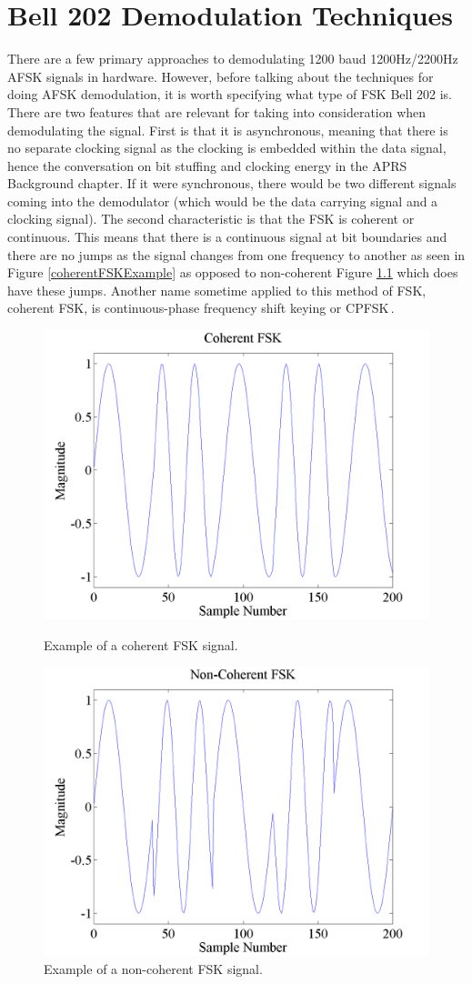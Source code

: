 \chapter{Bell 202 Demodulation Techniques}
There are a few primary approaches to demodulating 1200 baud 1200Hz/2200Hz AFSK signals in hardware.  However, before talking about the techniques for doing AFSK demodulation, it is worth specifying what type of FSK Bell 202 is. There are two features that are relevant for taking into consideration when demodulating the signal. First is that it is asynchronous, meaning that there is no separate clocking signal as the clocking is embedded within the data signal, hence the conversation on bit stuffing and clocking energy in the APRS Background chapter. If it were synchronous, there would be two different signals coming into the demodulator (which would be the data carrying signal and a clocking signal). The second characteristic is that the FSK is coherent or continuous. This means that there is a continuous signal at bit boundaries and there are no jumps as the signal changes from one frequency to another as seen in Figure \ref{coherentFSKExample} as opposed to non-coherent Figure \ref{noncoherentFSKExample} which does have these jumps. Another name sometime applied to this method of FSK, coherent FSK, is continuous-phase frequency shift keying or CPFSK\,\cite{WikipediaCPFSK}.

\begin{figure}
	\centering
	\includegraphics[width=0.75\linewidth]{images/CoherentFSK.png} 
	\caption{Example of a coherent FSK signal.}
	\label{coherentFSKExample}
	\vspace{15mm}
	\includegraphics[width=0.75\linewidth]{images/NonCoherentFSK.png} 
	\caption{Example of a non-coherent FSK signal.}
	\label{noncoherentFSKExample}
\end{figure}

